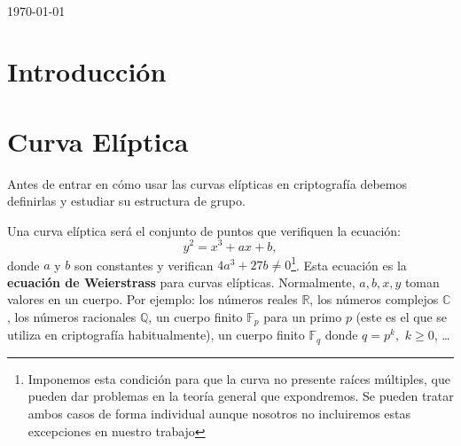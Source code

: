 \documentclass[11pt]{article}
\begin{document}
\begin{titlepage}
\centering
\vspace*{4.5cm}
\fontsize{30pt}{40pt}{\selectfont\sffamily{\textcolor{ColorTitulo}{Trabajo Teoría}}}\\
\vspace{5mm}
\fontsize{60pt}{50pt}{\selectfont\sffamily{\textcolor{ColorTitulo}{Curva Elíptica}}}
\vspace{1.5cm}

{\scshape\large \today \par}
\vspace{1cm}


\vspace*{\fill}
\vspace*{-2cm}

\end{titlepage}

\thispagestyle{empty}
\tableofcontents

\newpage

\section{Introducción}


\section{Curva Elíptica}
Antes de entrar en cómo usar las curvas elípticas en criptografía debemos definirlas y estudiar su estructura de grupo.

Una curva elíptica será el conjunto de puntos que verifiquen la ecuación:
\[y^2 = x^3 + ax + b,\]
donde $a$ y $b$ son constantes y verifican $4a^3+27b \neq 0$\footnote{Imponemos esta condición para que la curva no presente raíces múltiples, que pueden dar problemas en la teoría general que expondremos. Se pueden tratar ambos casos de forma individual aunque nosotros no incluiremos estas excepciones en nuestro trabajo}. Esta ecuación es la \textbf{ecuación de Weierstrass} para curvas elípticas. Normalmente, $a, b, x, y$ toman valores en un cuerpo. Por ejemplo: los números reales $\mathbb{R}$, los números complejos $\mathbb{C}$, los números racionales $\mathbb{Q}$, un cuerpo finito $\mathbb{F}_p$ para un primo $p$ (este es el que se utiliza en criptografía habitualmente), un cuerpo finito $\mathbb{F}_q$ donde $q = p^k,$ $k \ge 0$, \dots
\end{document}
